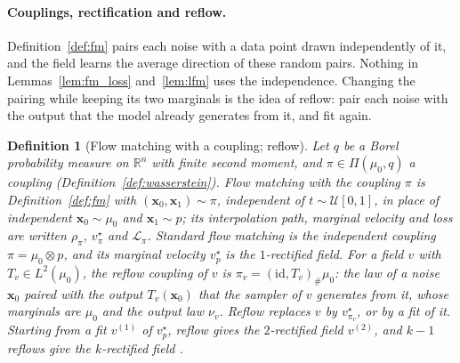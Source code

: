 \documentclass{article}
\newcommand{\RR}{\mathbb{R}}
\newcommand{\cL}{\mathcal{L}}
\newcommand{\bx}{\mathbf{x}}
\newcommand{\vstar}{v^{\star}}
\theoremstyle{plain}
\newtheorem{definition}[theorem]{Definition}
\theoremstyle{remark}
\begin{document}
\paragraph{Couplings, rectification and reflow.}
Definition~\ref{def:fm} pairs each noise with a data point drawn independently of it, and the field learns the average
direction of these random pairs. Nothing in Lemmas~\ref{lem:fm_loss} and~\ref{lem:lfm} uses the independence. Changing the
pairing while keeping its two marginals is the idea of reflow: pair each noise with the output that the model already
generates from it, and fit again.

\begin{definition}[Flow matching with a coupling; reflow]\label{def:reflow}
Let $q$ be a Borel probability measure on $\RR^n$ with finite second moment, and $\pi\in\Pi(\mu_0,q)$ a coupling
(Definition~\ref{def:wasserstein}). \emph{Flow matching with the coupling $\pi$} is Definition~\ref{def:fm} with $(\bx_0,\bx_1)\sim\pi$,
independent of $t\sim\mathcal U[0,1]$, in place of independent $\bx_0\sim\mu_0$ and $\bx_1\sim p$; its interpolation path, marginal
velocity and loss are written $\rho_\pi$, $\vstar_\pi$ and $\cL_\pi$. Standard flow matching is the \emph{independent coupling}
$\pi=\mu_0\otimes p$, and its marginal velocity $\vstar_p$ is the \emph{$1$-rectified} field. For a field $v$ with $T_v\in L^2(\mu_0)$, the
\emph{reflow coupling} of $v$ is $\pi_v=(\mathrm{id},T_v)_\#\mu_0$: the law of a noise $\bx_0$ paired with the output $T_v(\bx_0)$ that the
sampler of $v$ generates from it, whose marginals are $\mu_0$ and the output law $\nu_v$. \emph{Reflow} replaces $v$ by $\vstar_{\pi_v}$, or
by a fit of it. Starting from a fit $v^{(1)}$ of $\vstar_p$, reflow gives the \emph{$2$-rectified} field $v^{(2)}$, and $k-1$ reflows give the
\emph{$k$-rectified} field \citep{liu2023flow}.
\end{definition}
\end{document}

